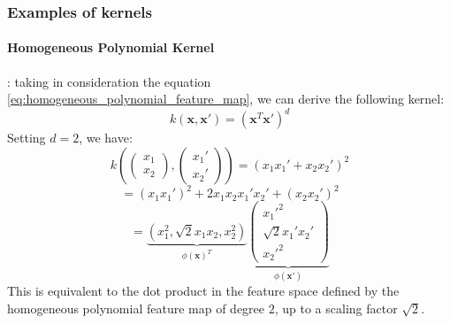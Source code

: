 \subsubsection{Examples of kernels}
\paragraph{Homogeneous Polynomial Kernel}:
taking in consideration the equation \ref{eq:homogeneous_polynomial_feature_map}, we can derive the following kernel:
\begin{equation}
    k(\boldsymbol{x}, \boldsymbol{x}') = (\boldsymbol{x}^T \boldsymbol{x}')^d
\end{equation}
Setting $d=2$, we have:
\[
    k(\begin{pmatrix} x_1 \\ x_2 \end{pmatrix}, \begin{pmatrix} x_1' \\ x_2' \end{pmatrix}) = (x_1 x_1' + x_2 x_2')^2
\]
\[
    = (x_1 x_1')^2 + 2 x_1 x_2 x_1' x_2' + (x_2 x_2')^2
\]
\[
= \underbrace{(x_1^2, \sqrt{2} x_1 x_2, x_2^2)}_{\phi(\boldsymbol{x})^T}
\underbrace{
    \begin{pmatrix}
    x_1'^2 \\
    \sqrt{2} x_1' x_2' \\
    x_2'^2
    \end{pmatrix}
}_{\phi(\boldsymbol{x}')}
\]
This is equivalent to the dot product in the feature space defined by the homogeneous polynomial feature map of degree $2$, up to a scaling factor $\sqrt{2}$.

